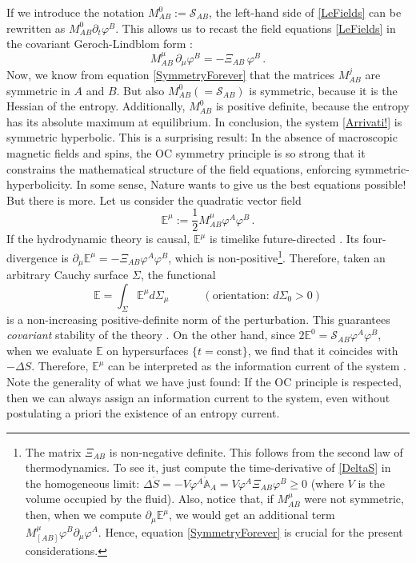 \documentclass[a4paper, amsfonts, amssymb, amsmath, reprint, showkeys, nofootinbib, twoside, onecolumn,notitlepage]{revtex4-1}
\newcommand{\spc}{\quad \quad \quad}
\begin{document}
If we introduce the notation $M^0_{AB}:= \mathcal{S}_{AB}$, the left-hand side of \eqref{LeFields} can be rewritten as $M^0_{AB}\partial_t \varphi^B$. This allows us to recast the field equations \eqref{LeFields} in the covariant Geroch-Lindblom form \cite{Geroch_Lindblom_1991_causal}:
\begin{equation}\label{Arrivati!}
M^\mu_{AB} \, \partial_\mu \varphi^B = -\Xi_{AB} \, \varphi^B \, .
\end{equation}
Now, we know from equation \eqref{SymmetryForever} that the matrices $M^j_{AB}$ are symmetric in $A$ and $B$. But also $M^0_{AB} (=\mathcal{S}_{AB})$ is symmetric, because it is the Hessian of the entropy. Additionally, $M^0_{AB}$ is positive definite, because the entropy has its absolute maximum at equilibrium. In conclusion, the system \eqref{Arrivati!} is symmetric hyperbolic. This is a surprising result: In the absence of macroscopic magnetic fields and spins, the OC symmetry principle is so strong that it constrains the mathematical structure of the field equations, enforcing symmetric-hyperbolicity. In some sense, Nature wants to give us the best equations possible! But there is more. Let us consider the quadratic vector field
\begin{equation}\label{nineth}
\mathbb{E}^\mu := \dfrac{1}{2} M^\mu_{AB} \varphi^A \varphi^B \,.
\end{equation}
If the hydrodynamic theory is causal, $\mathbb{E}^\mu$ is timelike future-directed \cite{Geroch_Lindblom_1991_causal}. Its four-divergence is $\partial_\mu \mathbb{E}^\mu = -\Xi_{AB}\varphi^A \varphi^B$, which is non-positive\footnote{The matrix $\Xi_{AB}$ is non-negative definite. This follows from the second law of thermodynamics. To see it, just compute the time-derivative of \eqref{DeltaS}  in the homogeneous limit: $\Delta \dot{S}= -V\varphi^A \dot{\mathbb{A}}_A = V \varphi^A \Xi_{AB} \varphi^B \geq 0$ (where $V$ is the volume occupied by the fluid). Also, notice that, if $M^\mu_{AB}$ were not symmetric, then, when we compute $\partial_\mu \mathbb{E}^\mu$, we would get an additional term $M^\mu_{[AB]}\varphi^B \partial_\mu \varphi^A$. Hence, equation \eqref{SymmetryForever} is crucial for the present considerations.}. Therefore, taken an arbitrary Cauchy surface $\Sigma$, the functional
\begin{equation}\label{Emumumu}
\mathbb{E} = \int_\Sigma \mathbb{E}^\mu d\Sigma_\mu \spc (\text{orientation: }d\Sigma_0 >0)
\end{equation}
is a non-increasing positive-definite norm of the perturbation. This guarantees \textit{covariant} stability of the theory \cite{Hishcock1983}. On the other hand, since $2\mathbb{E}^0 = \mathcal{S}_{AB}\varphi^A \varphi^B$, when we evaluate $\mathbb{E}$ on hypersurfaces $\{ t=\text{const} \}$, we find that it coincides with $-\Delta S$. Therefore, $\mathbb{E}^\mu$ can be interpreted as the information current of the system \cite{GavassinoGibbs2021,GavassinoCausality2021,
GavassinoStabilityCarter2022}. Note the generality of what we have just found: If the OC principle is respected, then we can always assign an information current to the system, even without postulating a priori the existence of an entropy current.
\end{document}
